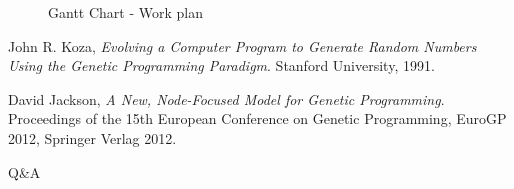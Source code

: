 \documentclass{beamer}
\begin{document}
\begin{frame}
\begin{figure}
{\begin{ganttchart}

\end{ganttchart}}
\caption{Gantt Chart - Work plan}
\label{fig:ganttchart}
\end{figure}

\end{frame}

\begin{thebibliography}{2}
  John R. Koza, 
  \emph{Evolving a Computer Program to Generate Random Numbers Using the Genetic Programming Paradigm}. 
  Stanford University, 
  1991.

  David Jackson,
  \emph{A New, Node-Focused Model for Genetic Programming}.
  Proceedings of the 15th European Conference on Genetic Programming, EuroGP 2012, 
  Springer Verlag
  2012.
\end{thebibliography}

\begin{frame}
\begin{center}Q\&A\end{center}
\end{frame}
\end{document}
